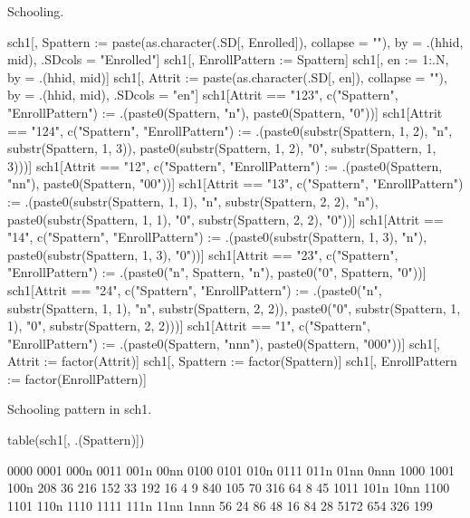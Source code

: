 Schooling. \gobblepars
\begin{Schunk}
\begin{Sinput}
sch1[, Spattern := paste(as.character(.SD[, Enrolled]), collapse = ""), 
  by = .(hhid, mid), .SDcols = "Enrolled"]
sch1[, EnrollPattern := Spattern]
sch1[, en := 1:.N, by = .(hhid, mid)]
sch1[, Attrit := paste(as.character(.SD[, en]), collapse = ""), 
  by = .(hhid, mid), .SDcols = "en"]
sch1[Attrit == "123", c("Spattern", "EnrollPattern") := 
  .(paste0(Spattern, "n"), paste0(Spattern, "0"))]
sch1[Attrit == "124", c("Spattern", "EnrollPattern") := 
  .(paste0(substr(Spattern, 1, 2), "n", substr(Spattern, 1, 3)), 
    paste0(substr(Spattern, 1, 2), "0", substr(Spattern, 1, 3)))]
sch1[Attrit == "12", c("Spattern", "EnrollPattern") := 
  .(paste0(Spattern, "nn"), paste0(Spattern, "00"))]
sch1[Attrit == "13", c("Spattern", "EnrollPattern") := 
  .(paste0(substr(Spattern, 1, 1), "n", substr(Spattern, 2, 2), "n"), 
    paste0(substr(Spattern, 1, 1), "0", substr(Spattern, 2, 2), "0"))]
sch1[Attrit == "14", c("Spattern", "EnrollPattern") := 
  .(paste0(substr(Spattern, 1, 3), "n"), 
    paste0(substr(Spattern, 1, 3), "0"))]
sch1[Attrit == "23", c("Spattern", "EnrollPattern") := 
  .(paste0("n", Spattern, "n"), 
    paste0("0", Spattern, "0"))]
sch1[Attrit == "24", c("Spattern", "EnrollPattern") := 
  .(paste0("n", substr(Spattern, 1, 1), "n", substr(Spattern, 2, 2)), 
    paste0("0", substr(Spattern, 1, 1), "0", substr(Spattern, 2, 2)))]
sch1[Attrit == "1", c("Spattern", "EnrollPattern") := 
  .(paste0(Spattern, "nnn"), 
    paste0(Spattern, "000"))]
sch1[, Attrit := factor(Attrit)]
sch1[, Spattern := factor(Spattern)]
sch1[, EnrollPattern := factor(EnrollPattern)]
\end{Sinput}
\end{Schunk}
Schooling pattern in sch1.
\begin{Schunk}
\begin{Sinput}
table(sch1[, .(Spattern)])
\end{Sinput}
\begin{Soutput}

0000 0001 000n 0011 001n 00nn 0100 0101 010n 0111 011n 01nn 0nnn 1000 1001 100n 
 208   36  216  152   33  192   16    4    9  840  105   70  316   64    8   45 
1011 101n 10nn 1100 1101 110n 1110 1111 111n 11nn 1nnn 
  56   24   86   48   16   84   28 5172  654  326  199 
\end{Soutput}
\end{Schunk}


